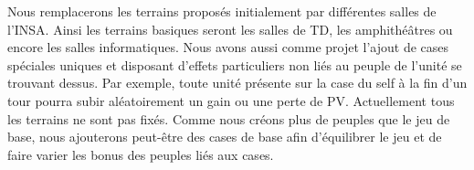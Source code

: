 Nous remplacerons les terrains proposés initialement par différentes salles de l'INSA. Ainsi les terrains basiques seront les salles de TD, les amphithéâtres ou encore les salles informatiques. Nous avons aussi comme projet l'ajout de cases spéciales uniques et disposant d'effets particuliers non liés au peuple de l'unité se trouvant dessus. Par exemple, toute unité présente sur la case du self à la fin d'un tour pourra subir aléatoirement un gain ou une perte de PV.
Actuellement tous les terrains ne sont pas fixés. Comme nous créons plus de peuples que le jeu de base, nous ajouterons peut-être des cases de base afin d'équilibrer le jeu et de faire varier les bonus des peuples liés aux cases.